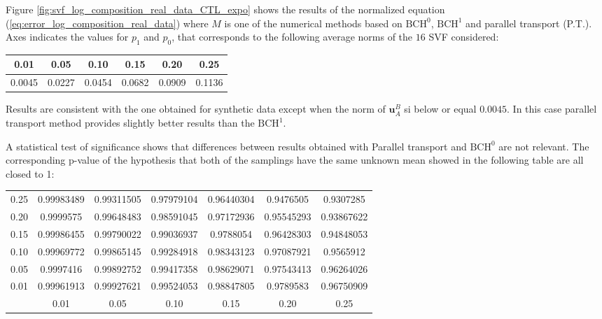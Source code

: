 Figure \ref{fig:svf_log_composition_real_data_CTL_expo} shows the results of the normalized equation (\ref{eq:error_log_composition_real_data}) where $M$ is one of the numerical methods based on $\text{BCH}^0$, $\text{BCH}^1$ and parallel transport (P.T.).
Axes indicates the values for $p_1$ and $p_0$, that corresponds to the following average norms of the $16$ SVF considered:

\begin{center}
 \begin{tabular}{ c | c | c | c | c | c  }
 	0.01 & 0.05 & 0.10 & 0.15 & 0.20 & 0.25 \\
 	\hline
 	 0.0045 &  0.0227 & 0.0454 & 0.0682 & 0.0909 & 0.1136
 \end{tabular}
\end{center}

Results are consistent with the one obtained for synthetic data except when the norm of $\mathbf{u}_{A}^{B}$ si below or equal $0.0045$. In this case parallel transport method provides slightly better results than the $\text{BCH}^1$. 

A statistical test of significance shows that differences between results obtained with Parallel transport and $\text{BCH}^0$ are not relevant. The corresponding p-value of the hypothesis that both of the samplings have the same unknown mean showed in the following table are all closed to 1:

\begin{center}
	\begin{tabular}{ c | c  c  c  c  c  c  }
	0.25	& 0.99983489 & 0.99311505 & 0.97979104 & 0.96440304 & 0.9476505  & 0.9307285 \\
	0.20	& 0.9999575  & 0.99648483 &  0.98591045 & 0.97172936 & 0.95545293 & 0.93867622\\
	0.15	& 0.99986455 & 0.99790022 & 0.99036937 & 0.9788054 &  0.96428303 & 0.94848053\\
	0.10	& 0.99969772 & 0.99865145 & 0.99284918 & 0.98343123 & 0.97087921 & 0.9565912 \\
	0.05	& 0.9997416  & 0.99892752 & 0.99417358  & 0.98629071 & 0.97543413 &  0.96264026\\
	0.01	& 0.99961913 & 0.99927621 & 0.99524053 & 0.98847805 & 0.9789583  & 0.96750909 \\
		\hline
		& 0.01 & 0.05 & 0.10 & 0.15 & 0.20 & 0.25 \\
	\end{tabular}
\end{center}


